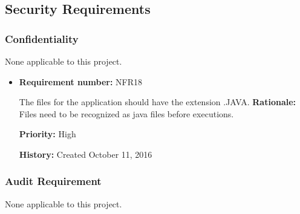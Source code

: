 \documentclass[12pt,letterpaper]{article}
\begin{document}
\subsection{Security Requirements}
\begin{reqbox}
	\begin{itemize}
\subsubsection{Confidentiality}
None applicable to this project.
	\end{itemize}
\end{reqbox}
\begin{reqbox}
	\begin{itemize}
\subsubsection{File Integrity Requirement}
	\item \textbf{Requirement number: }NFR18  
	
	The files for the application should have the extension .JAVA.
	\textbf{Rationale: }Files need to be recognized as java files before executions.
	
	\textbf{Priority: }High     
	 
	\textbf{History: }Created October 11, 2016  
	\end{itemize}
\end{reqbox}
\begin{reqbox}
	\begin{itemize}
\subsubsection{Audit Requirement}
None applicable to this project.
	\end{itemize}
\end{reqbox}
\end{document}
